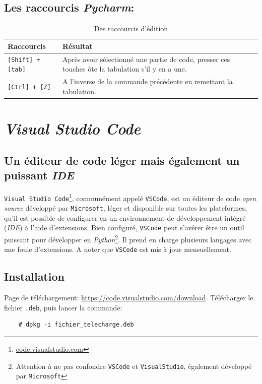 \subsection*{Les raccourcis \textit{Pycharm}:}
\begin{table}[h]
\begin{center}
\begin{tabular}{|p{4cm}|p{10cm}|}
\hline
\textbf{Raccourcis} & \textbf{Résultat} \\
\hline
\texttt{[Shift] + [tab]} & Après avoir sélectionné une partie de code, presser ces touches ôte la tabulation s'il y en a une. \\
\hline
\texttt{[Ctrl] + [Z]} & A l'inverse de la commande précédente en remettant la tabulation. \\
\hline
\end{tabular}
\caption{Des raccourcis d'édition}
\end{center}

\end{table}
\section{\textit{Visual Studio Code}}
\subsection*{Un éditeur de code léger mais également un puissant \textit{IDE}}
\texttt{Visual Studio Code}\footnote{\url{code.visualstudio.com}}, communément appelé \texttt{VSCode}, est un éditeur de code \textit{open source} développé par \texttt{Microsoft}, léger et disponible sur toutes les plateformes, qu'il est possible de configurer en un environnement de développement intégré (\textit{IDE}) à l'aide d'extensions. Bien configuré, \texttt{VSCode} peut s'avérer être un outil puissant pour développer en \textit{Python}\footnote{Attention à ne pas confondre \texttt{VSCode} et \texttt{VisualStudio}, également développé par \texttt{Microsoft}}. Il prend en charge plusieurs langages avec une foule d'extensions. A noter que \texttt{VSCode} est mis à jour mensuellement.
\medskip

\subsection*{Installation}
Page de téléchargement: \url{https://code.visualstudio.com/download}. Télécharger le fichier \texttt{.deb}, puis lancer la commande:
\begin{verbatim}
    # dpkg -i fichier_telecharge.deb
\end{verbatim}
\medskip

